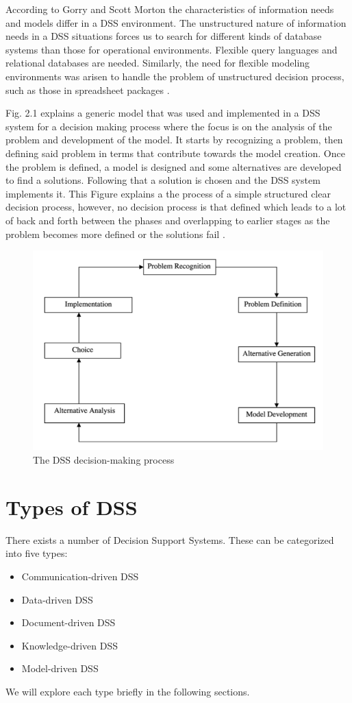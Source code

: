 \indent According to Gorry and Scott Morton the characteristics of information needs and models differ in a DSS environment. The unstructured nature of information needs in a DSS situations forces us to search for different kinds of database systems than those for operational environments. Flexible query languages and relational databases are needed. Similarly, the need for flexible modeling environments was arisen to handle the problem of unstructured decision process, such as those in spreadsheet packages \cite{shim2002past}.

\indent Fig. 2.1 explains a generic model that was used and implemented in a DSS system for a decision making process where the focus is on the analysis of the problem and development of the model. It starts by recognizing a problem, then defining said problem in terms that contribute towards the model creation. Once the problem is defined, a model is designed and some alternatives are developed to find a solutions. Following that a solution is chosen and the DSS system implements it. This Figure explains a the process of a simple structured clear decision process, however, no decision process is that defined which leads to a lot of back and forth between the phases and overlapping to earlier stages as the problem becomes more defined or the solutions fail \cite{shim2002past}.
\begin{figure}[H]
\centering
\includegraphics[scale=0.4]{Images/decisionSuppotProcess.png}
\caption[The DSS decision-making process]{The DSS decision-making process \cite{shim2002past}}
\end{figure}
\section{Types of DSS}
\label{sub:TypesOfDSS}
There exists a number of Decision Support Systems. These can be categorized into five types:
\begin{itemize} 
	\itemsep0em
	\item Communication-driven DSS  
	\item Data-driven DSS 
	\item Document-driven DSS 
	\item Knowledge-driven DSS 
	\item Model-driven DSS 
\end{itemize} 
We will explore each type briefly in the following sections.
